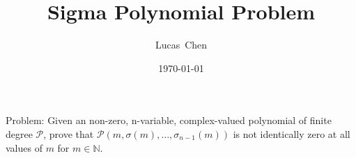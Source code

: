 \documentclass{amsart}
\title{Sigma Polynomial Problem}
\author{Lucas\ Chen}
\date{\today}
\begin{document}
\maketitle

Problem: Given an non-zero, n-variable, complex-valued polynomial of finite degree $\mathcal{P}$, prove that $\mathcal{P}(m, \sigma(m),\dots,\sigma_{n-1}(m))$ is not identically zero at all values of $m$ for $m\in\mathbb{N}$.
\end{document}
